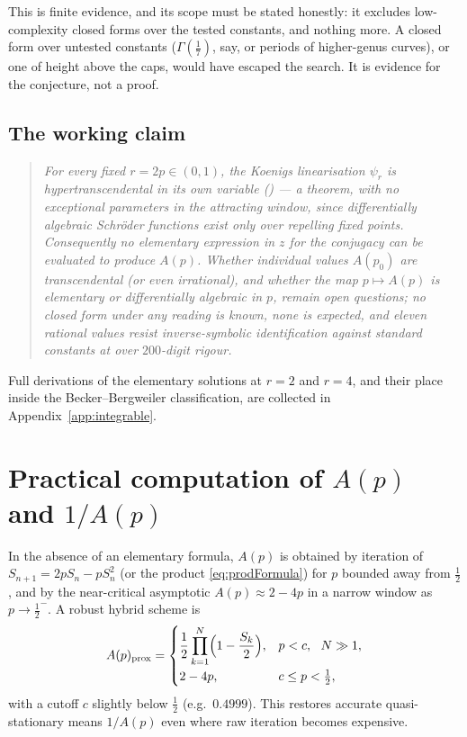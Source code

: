 \documentclass[11pt,a4paper]{article}
\theoremstyle{plain}
\theoremstyle{definition}
\begin{document}
This is finite evidence, and its scope must be stated honestly: it excludes low-complexity closed forms over the tested constants, and nothing more. A closed form over untested constants ($\Gamma(\tfrac17)$, say, or periods of higher-genus curves), or one of height above the caps, would have escaped the search. It is evidence for the conjecture, not a proof.

\subsection{The working claim}

\begin{quote}
\textit{For every fixed $r=2p\in(0,1)$, the Koenigs linearisation $\psi_r$ is hypertranscendental in its own variable () --- a theorem, with no exceptional parameters in the attracting window, since differentially algebraic Schr\"oder functions exist only over repelling fixed points. Consequently no elementary expression in $z$ for the conjugacy can be evaluated to produce $A(p)$. Whether individual values $A(p_0)$ are transcendental (or even irrational), and whether the map $p\mapsto A(p)$ is elementary or differentially algebraic in $p$, remain open questions; no closed form under any reading is known, none is expected, and eleven rational values resist inverse-symbolic identification against standard constants at over $200$-digit rigour.}
\end{quote}

Full derivations of the elementary solutions at $r=2$ and $r=4$, and their place inside the Becker--Bergweiler classification, are collected in Appendix~\ref{app:integrable}.

\section{Practical computation of $A(p)$ and $1/A(p)$}
\label{sec:practical}

In the absence of an elementary formula, $A(p)$ is obtained by iteration of $S_{n+1}=2pS_n-pS_n^2$ (or the product \eqref{eq:prodFormula}) for $p$ bounded away from $\tfrac12$, and by the near-critical asymptotic $A(p)\approx 2-4p$ in a narrow window as $p\to\tfrac12^{-}$. A robust hybrid scheme is
\begin{equation*}
A(p)_{\mathrm{prox}}
=
\begin{cases}
\dfrac12\displaystyle\prod_{k=1}^{N}\Bigl(1-\dfrac{S_k}{2}\Bigr), & p<c,\ \ N\gg 1,\\[1em]
2-4p, & c\le p<\tfrac12,
\end{cases}
\end{equation*}
with a cutoff $c$ slightly below $\tfrac12$ (e.g.\ $0.4999$). This restores accurate quasi-stationary means $1/A(p)$ even where raw iteration becomes expensive.
\end{document}
